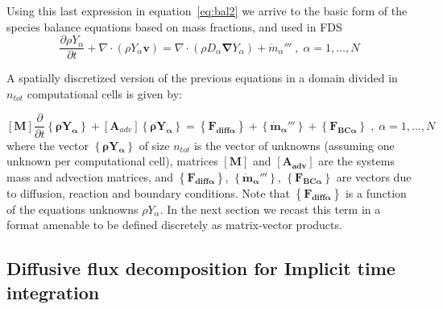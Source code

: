 Using this last expression in equation~\eqref{eq:bal2} we arrive to the basic form of the species balance equations based on mass fractions, and used in FDS
%
\begin{equation}
   \frac{\partial \rho Y_\alpha}{ \partial t} + \nabla \cdot ( \rho Y_\alpha  \mathbf{v} ) = \nabla \cdot ( \rho D_\alpha \boldsymbol{\nabla} Y_\alpha ) + \dot{m}_\alpha''' \; , \; \alpha=1,\dots,N \label{eq:bal3}
\end{equation}
%

A spatially discretized version of the previous equations in a domain divided in $n_{tot}$ computational cells is given by:

%
\begin{equation}
\left[ \mathbf{M} \right] \frac{\partial}{\partial t} \left\{ \mathbf{\rho Y_\alpha} \right\} + \left[ \mathbf{A}_{adv}  \right] \left\{ \mathbf{\rho Y_\alpha} \right\} = \left\{ \mathbf{F_{diff \alpha}} \right\} + \left\{  \mathbf{\dot{m}_\alpha'''} \right\} +  \left\{ \mathbf{F_{BC \alpha}} \right\} \; , \; \alpha=1,\dots,N \label{eq:discbal3}
\end{equation}
%
where the vector $\left\{ \mathbf{\rho Y_\alpha} \right\}$ of size $n_{tot}$ is the vector of unknowns (assuming one unknown per computational cell), matrices $\left[ \mathbf{M} \right]$ and $ \left[ \mathbf{A_{adv}}  \right]$ are the systems mass and advection matrices, and $\left\{ \mathbf{F_{diff \alpha}} \right\}$, $\left\{  \mathbf{\dot{m}_\alpha'''} \right\}$, $\left\{ \mathbf{F_{BC \alpha}} \right\}$ are vectors due to diffusion, reaction and boundary conditions. Note that $\left\{ \mathbf{F_{diff \alpha}} \right\}$ is a function of the equations unknowns $\rho Y_\alpha$. In the next section we recast this term in a format amenable to be defined discretely as matrix-vector products.


\subsection*{Diffusive flux decomposition for Implicit time integration}

